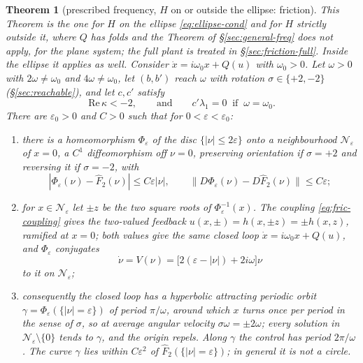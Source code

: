 \documentclass[11pt,reqno]{amsart}
\theoremstyle{plain}
\newtheorem*{theorem}{Theorem}
\theoremstyle{definition}
\theoremstyle{remark}
\begin{document}
\begin{theorem}[prescribed frequency, $H$ on or outside the ellipse: friction]\label{thm:friction}
This Theorem is the one for $H$ on the ellipse \eqref{eq:ellipse-cond} and for $H$ strictly outside it, where $Q$ has
folds and the Theorem of \S\ref{sec:general-freq} does not apply, for the plane system; the full plant is treated in
\S\ref{sec:friction-full}. Inside the ellipse it applies as well.
Consider $\dot x=i\omega_0x+Q(u)$ with $\omega_0>0$. Let $\omega>0$ with $2\omega\neq\omega_0$ and
$4\omega\neq\omega_0$, let $(b,b')$ reach $\omega$ with rotation $\sigma\in\{+2,-2\}$ \textup{(}\S\ref{sec:reachable}\textup{)},
and let $c,c'$ satisfy
\[
  \mathrm{Re}\,\kappa<-2,\qquad\text{and}\qquad c'\lambda_1=0\ \text{ if }\ \omega=\omega_0 .
\]
There are $\varepsilon_0>0$ and $C>0$ such that for $0<\varepsilon<\varepsilon_0$:
\begin{enumerate}
\item[\textup{(i)}] there is a homeomorphism $\Phi_\varepsilon$ of the disc $\{|\nu|\le2\varepsilon\}$ onto a neighbourhood
  $\mathcal N_\varepsilon$ of $x=0$, a $C^{1}$ diffeomorphism off $\nu=0$, preserving orientation if $\sigma=+2$ and reversing it
  if $\sigma=-2$, with
  \[
    |\Phi_\varepsilon(\nu)-\hat F_2(\nu)|\le C\varepsilon|\nu|,\qquad \|D\Phi_\varepsilon(\nu)-D\hat F_2(\nu)\|\le C\varepsilon ;
  \]
\item[\textup{(ii)}] for $x\in \mathcal N_\varepsilon$ let $\pm z$ be the two square roots of $\Phi_\varepsilon^{-1}(x)$. The coupling
  \eqref{eq:fric-coupling} gives the two-valued feedback $u(x,\pm)=h(x,\pm z)=\pm h(x,z)$, ramified at $x=0$; both
  values give the same closed loop $\dot x=i\omega_0x+Q(u)$, and $\Phi_\varepsilon$ conjugates
  \[
    \dot\nu=V(\nu)=\bigl[2(\varepsilon-|\nu|)+2i\omega\bigr]\nu
  \]
  to it on $\mathcal N_\varepsilon$;
\item[\textup{(iii)}] consequently the closed loop has a hyperbolic attracting periodic orbit
  $\gamma=\Phi_\varepsilon(\{|\nu|=\varepsilon\})$ of period $\pi/\omega$, around which $x$ turns once per period in the sense
  of $\sigma$, so at average angular velocity $\sigma\omega=\pm2\omega$; every solution in $\mathcal N_\varepsilon\setminus\{0\}$ tends to
  $\gamma$, and the origin repels. Along $\gamma$ the control has period $2\pi/\omega$. The curve $\gamma$ lies within
  $C\varepsilon^{2}$ of $\hat F_2(\{|\nu|=\varepsilon\})$; in general it is not a circle.
\end{enumerate}
\end{theorem}
\end{document}
